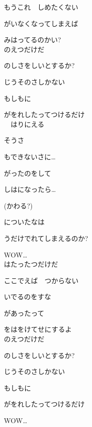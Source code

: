 もうこれ　しめたくない

がいなくなってしまえば

みはってるのかい?
\\

のえつだけだ

のしさをしいとするか?

じうそのさしかない

もしもに

がをれしたってつけるだけ
\\

　はりにえる

そうさ

もできないさに…

がったのをして

しはになったら…

(かわる?)

についたなは

うだけでれてしまえるのか?

WOW…
\\

はたったつだけだ

ここでえば　つからない

いでるのをすな

があったって

をはをけてせにするよ
\\

のえつだけだ

のしさをしいとするか?

じうそのさしかない

もしもに

がをれしたってつけるだけ

WOW…
\\

